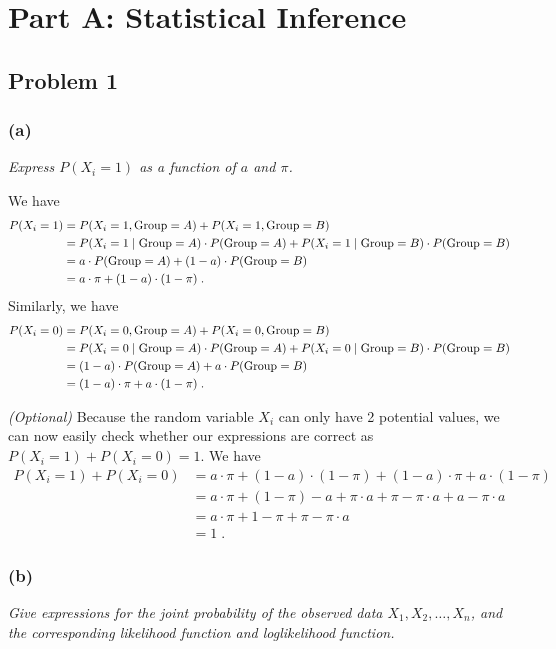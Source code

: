 \chapter{Part A: Statistical Inference}
\section{Problem 1}
\subsection{(a)}
\textit{Express $P(X_i = 1)$ as a function of $a$ and $\pi$.}

We have
\begin{align*}
    P(X_i = 1) &= P(X_i = 1, \text{Group} = A) + P(X_i=1, \text{Group} = B) \\
    &= P(X_i = 1\mid \text{Group} = A) \cdot P(\text{Group} = A) + P(X_i=1 \mid \text{Group} = B) \cdot P(\text{Group} = B) \\
    &= a \cdot P(\text{Group} = A) + (1-a) \cdot P(\text{Group} = B) \\
    &= a \cdot \pi + (1-a) \cdot (1-\pi)\;.
\end{align*}
Similarly, we have
\begin{align*}
    P(X_i = 0) &= P(X_i = 0, \text{Group} = A) + P(X_i=0, \text{Group} = B) \\
    &= P(X_i = 0\mid \text{Group} = A) \cdot P(\text{Group} = A) + P(X_i=0 \mid \text{Group} = B) \cdot P(\text{Group} = B) \\
    &= (1-a) \cdot P(\text{Group} = A) + a \cdot P(\text{Group} = B) \\
    &= (1-a) \cdot \pi + a \cdot (1-\pi) \;.
\end{align*}

\textit{(Optional)}
Because the random variable $X_i$ can only have 2 potential values, we can now easily check whether our expressions are correct as $P(X_i = 1) + P(X_i = 0) = 1$. We have
\begin{align*}
    P(X_i = 1) + P(X_i = 0) &= a \cdot \pi + (1-a) \cdot (1-\pi) + (1-a) \cdot \pi + a \cdot (1-\pi) \\
    &= a \cdot \pi + (1-\pi) - a +\pi \cdot a + \pi - \pi \cdot a + a - \pi \cdot a \\
    &= a \cdot \pi + 1-\pi + \pi - \pi \cdot a \\
    &= 1\;.
\end{align*}

\subsection{(b)}
\textit{Give expressions for the joint probability of the observed data $X_1, X_2, \dots , X_n$, and the corresponding likelihood function and loglikelihood function.}

